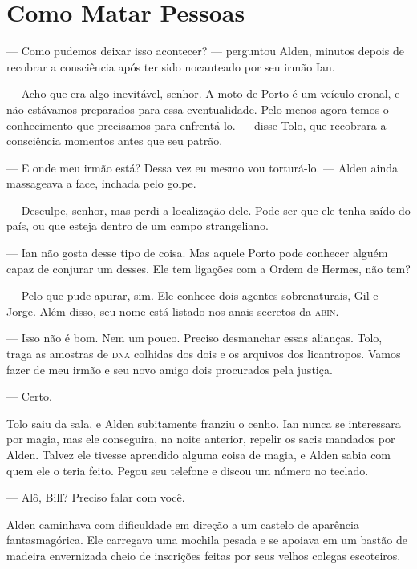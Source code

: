 \chapter{Como Matar Pessoas}


--- Como pudemos deixar isso acontecer? --- perguntou Alden, minutos depois de
recobrar a consciência após ter sido nocauteado por seu irmão Ian.

--- Acho que era algo inevitável, senhor. A moto de Porto é um veículo cronal,
e não estávamos preparados para essa eventualidade. Pelo menos agora temos o
conhecimento que precisamos para enfrentá-lo. --- disse Tolo, que recobrara a
consciência momentos antes que seu patrão.

--- E onde meu irmão está? Dessa vez eu mesmo vou torturá-lo. --- Alden ainda
massageava a face, inchada pelo golpe.

--- Desculpe, senhor, mas perdi a localização dele. Pode ser que ele tenha
saído do país, ou que esteja dentro de um campo strangeliano.

--- Ian não gosta desse tipo de coisa. Mas aquele Porto pode conhecer alguém
capaz de conjurar um desses. Ele tem ligações com a Ordem de Hermes, não tem?

--- Pelo que pude apurar, sim. Ele conhece dois agentes sobrenaturais, Gil e
Jorge. Além disso, seu nome está listado nos anais secretos da \textsc{abin}.

--- Isso não é bom. Nem um pouco. Preciso desmanchar essas alianças. Tolo,
traga as amostras de \textsc{dna} colhidas dos dois e os arquivos dos
licantropos. Vamos fazer de meu irmão e seu novo amigo dois procurados pela
justiça.

--- Certo.

Tolo saiu da sala, e Alden subitamente franziu o cenho. Ian nunca se
interessara por magia, mas ele conseguira, na noite anterior, repelir os sacis
mandados por Alden. Talvez ele tivesse aprendido alguma coisa de magia, e Alden
sabia com quem ele o teria feito. Pegou seu telefone e discou um número no
teclado.

--- Alô, Bill? Preciso falar com você.


Alden caminhava com dificuldade em direção a um castelo de aparência
fantasmagórica. Ele carregava uma mochila pesada e se apoiava em um bastão de
madeira envernizada cheio de inscrições feitas por seus velhos colegas
escoteiros.

